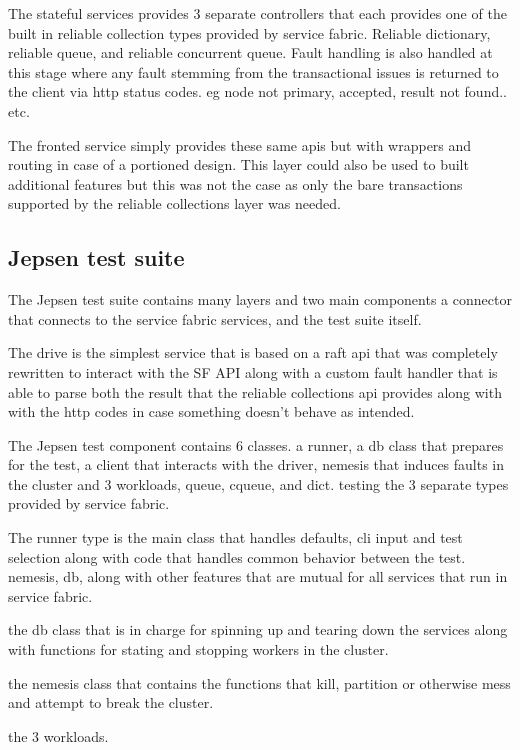 \documentclass[a4paper,10pt,titlepage]{report}
\begin{document}
    The stateful services provides 3 separate controllers that each provides one of the built in reliable collection types provided by service fabric. Reliable dictionary, reliable queue, and reliable concurrent queue. Fault handling is also handled at this stage where any fault stemming from the transactional issues is returned to the client via http status codes\cite{https://en.wikipedia.org/wiki/List_of_HTTP_status_codes}. eg node not primary, accepted, result not found.. etc.

    The fronted service simply provides these same apis but with wrappers and routing in case of a portioned design. This layer could also be used to built additional features but this was not the case as only the bare transactions supported by the reliable collections layer was needed.

    \subsection{Jepsen test suite}
    The Jepsen test suite contains many layers and two main components a connector that connects to the service fabric services, and the test suite itself.

    The drive is the simplest service that is based on a raft api that was completely rewritten to interact with the SF API along with a custom fault handler that is able to parse both the result that the reliable collections api provides along with with the http codes in case something doesn't behave as intended.

    The Jepsen test component contains 6 classes. a runner, a db class that prepares for the test, a client that interacts with the driver, nemesis that induces faults in the cluster and 3 workloads, queue, cqueue, and dict. testing the 3 separate types provided by service fabric.

    The runner type is the main class that handles defaults, cli input and test selection along with code that handles common behavior between the test. nemesis, db, along with other features that are mutual for all services that run in service fabric.

    the db class that is in charge for spinning up and tearing down the services along with functions for stating and stopping workers in the cluster.

    the nemesis class that contains the functions that kill, partition or otherwise mess and attempt to break the cluster.

    the 3 workloads.
\end{document}
